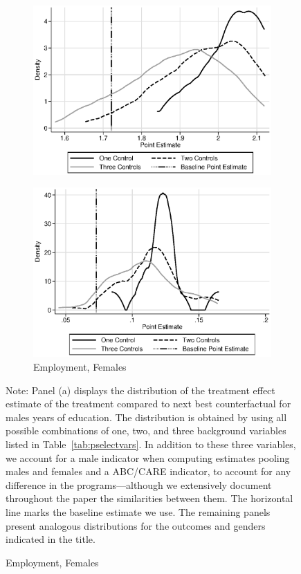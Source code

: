 \begin{figure}
\begin{subfigure}[h]{0.4\textwidth}
		\includegraphics[width=\textwidth]{output/sencontrols_female_years_30y_itt_wctrl.eps}
\end{subfigure}%
\begin{subfigure}[h]{0.4\textwidth}
	\centering
	\caption{Employment, Females}
		\includegraphics[width=\textwidth]{output/sencontrols_female_si30y_works_itt_wctrl.eps}
\end{subfigure}
\footnotesize \justify
Note: Panel (a) displays the distribution of the treatment effect estimate of the treatment compared to next best counterfactual for males years of education. The distribution is obtained by using all possible combinations of one, two, and three background variables listed in Table~\ref{tab:pselectvars}. In addition to these three variables, we account for a male indicator when computing estimates pooling males and females and a ABC/CARE indicator, to account for any difference in the programs---although we extensively document throughout the paper the similarities between them. The horizontal line marks the baseline estimate we use. The remaining panels present analogous distributions for the outcomes and genders indicated in the title.\\
\end{figure}

